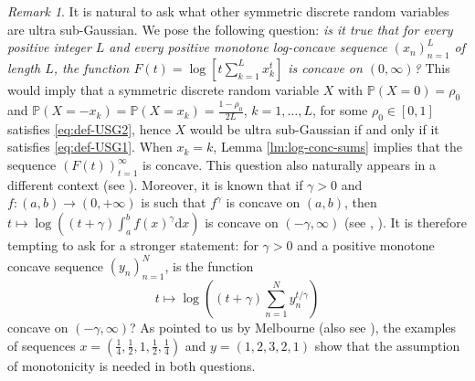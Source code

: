 \documentclass[10pt]{article}
\newcommand{\dd}{\mathrm{d}}
\newcommand{\1}{\textbf{1}}
\newcommand{\p}[1]{\mathbb{P}\left( #1 \right)}
\theoremstyle{remark}
\newtheorem{remark}[theorem]{Remark}
\theoremstyle{definition}
\begin{document}
\begin{remark}\label{rem:conj}
It is natural to ask what other symmetric discrete random variables are ultra sub-Gaussian. We pose the following question: \emph{is it true that for every positive integer $L$ and every positive monotone log-concave sequence $(x_n)_{n=1}^L$ of length $L$, the function $F(t) = \log\left[t\sum_{k=1}^L x_k^t\right]$ is concave on $(0,\infty)$?} This would imply that a symmetric discrete random variable $X$ with $\p{X = 0} = \rho_0$ and $\p{X = -x_k} = \p{X = x_k} = \frac{1-\rho_0}{2L}$, $k = 1,\dots,L$, for some $\rho_0 \in [0,1]$ satisfies \eqref{eq:def-USG2}, hence $X$ would be ultra sub-Gaussian if and only if it satisfies \eqref{eq:def-USG1}. When $x_k = k$, Lemma \ref{lm:log-conc-sums} implies that the sequence $(F(t))_{t=1}^\infty$ is concave. This question also naturally appears in a different context (see \cite{Mel}). Moreover, it is known that if $\gamma > 0$ and $f\colon (a,b) \to (0,+\infty)$ is such that $f^\gamma$ is concave on $(a,b)$, then $t \mapsto \log\left((t+\gamma)\int_a^b f(x)^\gamma \dd x\right)$ is concave on $(-\gamma,\infty)$ (see \cite{bor}, \cite{cohn}). It is therefore tempting to ask for a stronger statement: for $\gamma > 0$ and a positive monotone concave sequence $(y_n)_{n=1}^N$, is the function
\[
t \mapsto \log\left((t+\gamma)\sum_{n=1}^N y_n^{t/\gamma}\right)
\]
concave on $(-\gamma,\infty)$? As pointed to us by Melbourne (also see \cite{Mel}), the examples of sequences $x = (\frac14,\frac12,1,\frac12,\frac14)$ and $y = (1,2,3,2,1)$ show that the assumption of monotonicity is needed in both questions.
\end{remark}
\end{document}
